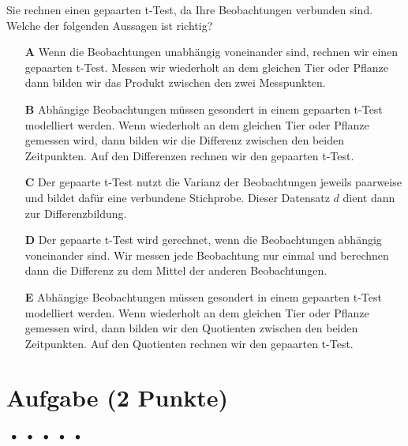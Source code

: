\documentclass[a4paper, 9pt]{scrartcl}\usepackage[]{graphicx}\usepackage[]{xcolor}
\begin{document}
Sie rechnen einen gepaarten t-Test, da Ihre Beobachtungen verbunden sind. Welche der folgenden Aussagen ist richtig?



\begin{enumerate}
\item [\textbf{A} \msquare] Wenn die Beobachtungen unabhängig voneinander sind, rechnen wir einen gepaarten t-Test. Messen wir wiederholt an dem gleichen Tier oder Pflanze dann bilden wir das Produkt zwischen den zwei Messpunkten.
\item [\textbf{B} \msquare] Abhängige Beobachtungen müssen gesondert in einem gepaarten t-Test modelliert werden. Wenn wiederholt an dem gleichen Tier oder Pflanze gemessen wird, dann bilden wir die Differenz zwischen den beiden Zeitpunkten. Auf den Differenzen rechnen wir den gepaarten t-Test.
\item [\textbf{C} \msquare] Der gepaarte t-Test nutzt die Varianz der Beobachtungen jeweils paarweise und bildet dafür eine verbundene Stichprobe. Dieser Datensatz $d$ dient dann zur Differenzbildung.
\item [\textbf{D} \msquare] Der gepaarte t-Test wird gerechnet, wenn die Beobachtungen abhängig voneinander sind. Wir messen jede Beobachtung nur einmal und berechnen dann die Differenz zu dem Mittel der anderen Beobachtungen.
\item [\textbf{E} \msquare] Abhängige Beobachtungen müssen gesondert in einem gepaarten t-Test modelliert werden. Wenn wiederholt an dem gleichen Tier oder Pflanze gemessen wird, dann bilden wir den Quotienten zwischen den beiden Zeitpunkten. Auf den Quotienten rechnen wir den gepaarten t-Test.
\end{enumerate}

\section{Aufgabe \hfill (2 Punkte)}

\ifcollection
\begin{flushright}
\tiny\vspace{-2Ex}
\textbf{\examinhaltstart}
\exammodulemathstat $\;\bullet$
\exammodulestat $\;\bullet$
\exammodulestat $\;\bullet$
\exammodulestatbbv $\;\bullet$
\exammodulestatversuch $\;\bullet$
\exammodulebiostat
\vspace{-1Ex}
\end{flushright}
\fi
\end{document}
